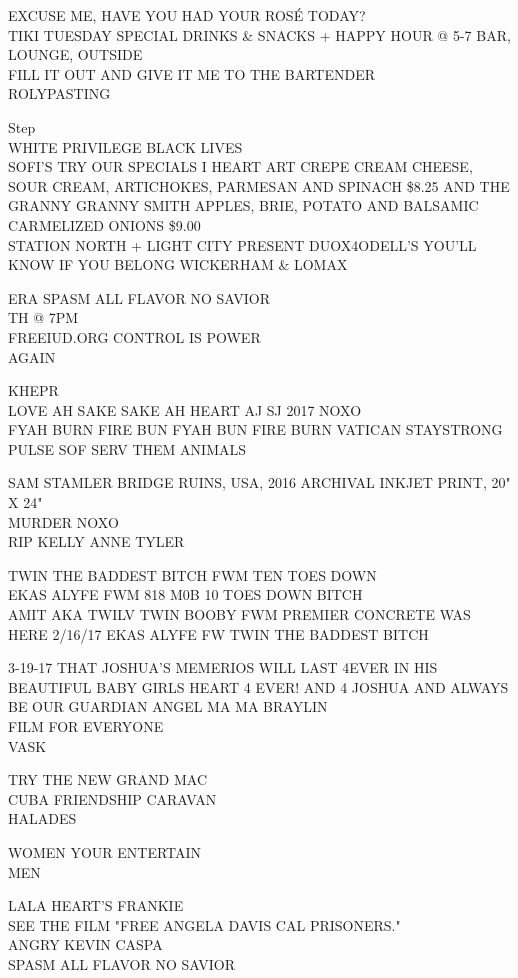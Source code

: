 \documentclass[10pt,letterpaper]{article}
\begin{document}
EXCUSE ME, HAVE YOU HAD YOUR ROSÉ TODAY?\\
TIKI TUESDAY SPECIAL DRINKS \& SNACKS + HAPPY HOUR @ 5{-}7 BAR, LOUNGE, OUTSIDE\\
FILL IT OUT AND GIVE IT ME TO THE BARTENDER\\
ROLYPASTING

Step\\
WHITE PRIVILEGE BLACK LIVES\\
SOFI'S TRY OUR SPECIALS I HEART ART CREPE CREAM CHEESE, SOUR CREAM, ARTICHOKES, PARMESAN AND SPINACH \$8.25 AND THE GRANNY GRANNY SMITH APPLES, BRIE, POTATO AND BALSAMIC CARMELIZED ONIONS \$9.00\\
STATION NORTH + LIGHT CITY PRESENT DUOX4ODELL'S YOU'LL KNOW IF YOU BELONG WICKERHAM \& LOMAX

ERA SPASM ALL FLAVOR NO SAVIOR\\
TH @ 7PM\\
FREEIUD.ORG CONTROL IS POWER\\
AGAIN

KHEPR\\
LOVE AH SAKE SAKE AH HEART AJ SJ 2017 NOXO\\
FYAH BURN FIRE BUN FYAH BUN FIRE BURN VATICAN STAYSTRONG\\
PULSE SOF SERV THEM ANIMALS

SAM STAMLER BRIDGE RUINS, USA, 2016 ARCHIVAL INKJET PRINT, 20" X 24"\\
MURDER NOXO\\
RIP KELLY ANNE TYLER

TWIN THE BADDEST BITCH FWM TEN TOES DOWN\\
EKAS ALYFE FWM 818 M0B 10 TOES DOWN BITCH\\
AMIT AKA TWILV TWIN BOOBY FWM PREMIER CONCRETE WAS HERE 2/16/17 EKAS ALYFE FW TWIN THE BADDEST BITCH

3{-}19{-}17 THAT JOSHUA'S MEMERIOS WILL LAST 4EVER IN HIS BEAUTIFUL BABY GIRLS HEART 4 EVER!  AND 4 JOSHUA AND ALWAYS BE OUR GUARDIAN ANGEL MA MA BRAYLIN\\
FILM FOR EVERYONE\\
VASK

TRY THE NEW GRAND MAC\\
CUBA FRIENDSHIP CARAVAN\\
HALADES

WOMEN YOUR ENTERTAIN\\
MEN

LALA HEART'S FRANKIE\\
SEE THE FILM "FREE ANGELA DAVIS CAL PRISONERS."\\
ANGRY KEVIN CASPA\\
SPASM ALL FLAVOR NO SAVIOR
\end{document}
